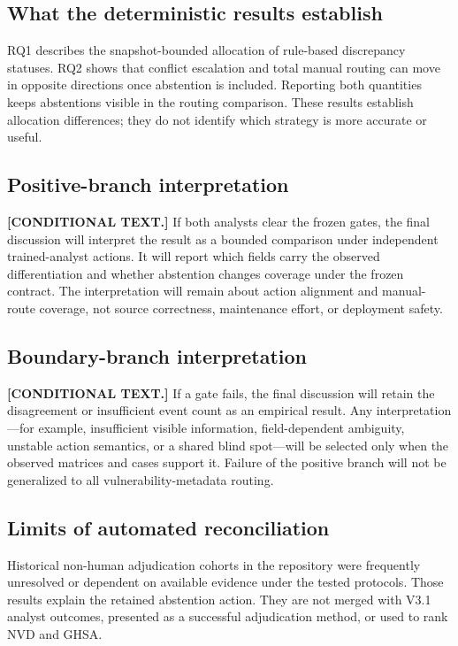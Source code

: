 \documentclass[preprint,review,12pt,authoryear]{elsarticle}
\begin{document}
\subsection{What the deterministic results establish}

RQ1 describes the snapshot-bounded allocation of rule-based discrepancy
statuses. RQ2 shows that conflict escalation and total manual routing can move
in opposite directions once abstention is included. Reporting both quantities
keeps abstentions visible in the routing comparison. These results establish
allocation differences; they do not identify which strategy is more accurate
or useful.

\subsection{Positive-branch interpretation}

\textbf{[CONDITIONAL TEXT.]}
If both analysts clear the frozen gates, the final discussion will interpret the
result as a bounded comparison under independent trained-analyst actions. It
will report which fields carry the observed differentiation and whether
abstention changes coverage under the frozen contract. The interpretation will
remain about action alignment and manual-route coverage, not source correctness,
maintenance effort, or deployment safety.

\subsection{Boundary-branch interpretation}

\textbf{[CONDITIONAL TEXT.]}
If a gate fails, the final discussion will retain the disagreement or
insufficient event count as an empirical result. Any interpretation---for
example, insufficient visible information, field-dependent ambiguity, unstable
action semantics, or a shared blind spot---will be selected only when the
observed matrices and cases support it. Failure of the positive branch will not
be generalized to all vulnerability-metadata routing.

\subsection{Limits of automated reconciliation}

Historical non-human adjudication cohorts in the repository were frequently
unresolved or dependent on available evidence under the tested protocols.
Those results explain the retained abstention action. They are not merged with
V3.1 analyst outcomes, presented as a successful adjudication method, or used to
rank NVD and GHSA.
\end{document}
